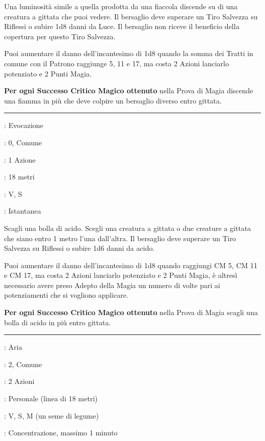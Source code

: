 \begin{multicols}{2}
Una luminosità simile a quella prodotta da una fiaccola discende su di una creatura a gittata che puoi vedere. Il bersaglio deve superare un Tiro Salvezza su Riflessi o subire 1d8 danni da Luce. Il bersaglio non riceve il beneficio della copertura per questo Tiro Salvezza.

Puoi aumentare il danno dell'incantesimo di 1d8 quando la somma dei Tratti in comune con il Patrono raggiunge 5, 11 e 17, ma costa 2 Azioni lanciarlo potenziato e 2 Punti Magia.

\textbf{Per ogni Successo Critico Magico ottenuto} nella Prova di Magia discende una fiamma in più che deve colpire un bersaglio diverso entro gittata.

\smallskip\noindent\rule{\linewidth}{2pt} \hypertarget{Fiotto Acido}{}\medskip{}\label{Acid Splash}
\noindent
\begin{description}[noitemsep, topsep=0pt, parsep=0pt, partopsep=0pt, leftmargin=0cm, labelwidth=2.8cm]
	\item[\textbf{Lista di Magia}]: Evocazione
	\item[\textbf{Livello}]: 0, Comune
	\item[\textbf{T. di Lancio}]: 1 Azione
	\item[\textbf{Gittata}]: 18 metri
	\item[\textbf{Componenti}]: V, S
	\item[\textbf{Durata}]: Istantanea
\end{description}

Scagli una bolla di acido. Scegli una creatura a gittata o due creature a gittata che siano entro 1 metro l'una dall'altra. Il bersaglio deve superare un Tiro Salvezza su Riflessi o subire 1d6 danni da acido.

Puoi aumentare il danno dell'incantesimo di 1d8 quando raggiungi CM 5, CM 11 e CM 17, ma costa 2 Azioni lanciarlo potenziato e 2 Punti Magia, è altresì necessario avere preso Adepto della Magia un numero di volte pari ai potenziamenti che si vogliono applicare.

\textbf{Per ogni Successo Critico Magico ottenuto} nella Prova di Magia scagli una bolla di acido in più entro gittata.

\smallskip\noindent\rule{\linewidth}{2pt} \hypertarget{Folata di Vento}{}\medskip{}
\noindent
\begin{description}[noitemsep, topsep=0pt, parsep=0pt, partopsep=0pt, leftmargin=0cm, labelwidth=2.8cm]
	\item[\textbf{Lista di Magia}]: Aria
	\item[\textbf{Livello}]: 2, Comune
	\item[\textbf{T. di Lancio}]: 2 Azioni
	\item[\textbf{Gittata}]: Personale (linea di 18 metri)
	\item[\textbf{Componenti}]: V, S, M (un seme di legume)
	\item[\textbf{Durata}]: Concentrazione, massimo 1 minuto
\end{description}


\end{multicols}
